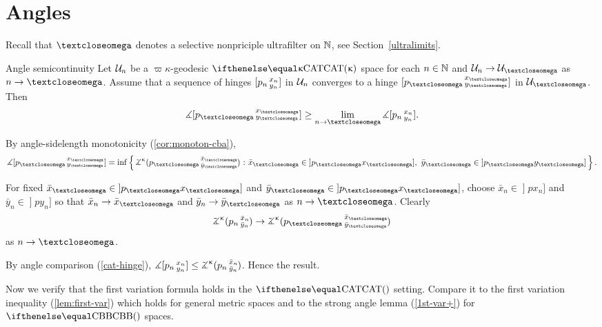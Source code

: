 

\section{Angles}
\label{sec:angles-cba}

Recall that $\o$ denotes a selective nonpriciple ultrafilter on $\mathbb{N}$, see Section~\ref{ultralimits}. 

\begin{thm}{Angle semicontinuity}\label{lem:ang.semicont}
Let $\mathcal{U}_n$  be a $\varpi\kappa$-geodesic $\CAT\kappa$  space for each $n\in \NN$
and $\spc{U}_n\to \spc{U}_\o$ as $n\to\o$.
Assume that a sequence of hinges $[p_n\,{}^{x_n}_{y_n}]$ in $\mathcal{U}_n$ converges to a hinge $\hinge{p_\o}{x_\o}{y_\o}$ in  $\spc{U}_\o$.
Then 
\[\mangle\hinge{p_\o}{x_\o}{y_\o}
\ge 
\lim_{n\to\o} \mangle\hinge{p_n}{x_n}{y_n}.\]

\end{thm}


By angle-sidelength monotonicity (\ref{cor:monoton-cba}),
\[\mangle\hinge{p_\o}{x_\o}{y_\o}
=
\inf\set{\angk\kappa{p_\o}{\bar x_\o}{\bar y_\o}}{\bar x_\o \in \mathopen{]}p_\o x_\o],\ \bar y_\o\in \mathopen{]}p_\o y_\o]}.\]

For fixed $\bar x_\o \in \mathopen{]}p_\o x_\o]$ 
and $\bar y_\o\in \mathopen{]}p_\o x_\o]$,
choose $\bar x_n\in \mathopen{]} p x_n ]$ and $\bar y_n\in \mathopen{]} p y_n ]$ so that $\bar x_n\to \bar x_\o$ 
and $\bar y_n\to \bar y_\o$ as $n\to\o$.
Clearly 
\[\angk\kappa{p_n}{\bar x_n}{\bar y_n}
\to 
\angk\kappa{p_\o}{\bar x_\o}{\bar y_\o}\] 
as $n\to\o$.

By angle comparison (\ref{cat-hinge}), $\mangle\hinge{p_n}{x_n}{y_n}\le \angk\kappa{p_n}{\bar x_n}{\bar y_n}$.
Hence the result.
\qeds

Now we verify that the first variation formula 
holds in the $\CAT{}$ setting. 
Compare it to the first variation inequality (\ref{lem:first-var}) which holds for general metric spaces and to the
strong angle lemma (\ref{1st-var+}) for $\Alex{}$ spaces. 

